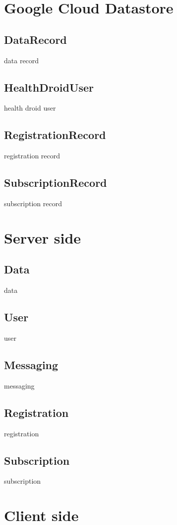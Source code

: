 \section{Google Cloud Datastore}
\subsection{DataRecord}
data record

\subsection{HealthDroidUser}
health droid user

\subsection{RegistrationRecord}
registration record

\subsection{SubscriptionRecord}
subscription record

\section{Server side}
\subsection{Data}
data

\subsection{User}
user

\subsection{Messaging}
messaging

\subsection{Registration}
registration

\subsection{Subscription}
subscription

\section{Client side}
